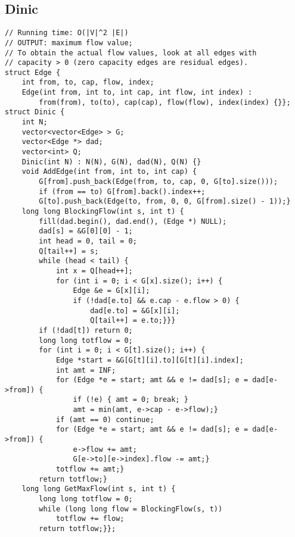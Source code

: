 \documentclass[8pt, oneside]{extarticle}
\begin{document}
\begin{multicols}{3}
\subsection{Dinic}
\begin{lstlisting}
// Running time: O(|V|^2 |E|)
// OUTPUT: maximum flow value;
// To obtain the actual flow values, look at all edges with
// capacity > 0 (zero capacity edges are residual edges).
struct Edge {
    int from, to, cap, flow, index;
    Edge(int from, int to, int cap, int flow, int index) :
        from(from), to(to), cap(cap), flow(flow), index(index) {}};
struct Dinic {
    int N;
    vector<vector<Edge> > G;
    vector<Edge *> dad;
    vector<int> Q;
    Dinic(int N) : N(N), G(N), dad(N), Q(N) {}
    void AddEdge(int from, int to, int cap) {
        G[from].push_back(Edge(from, to, cap, 0, G[to].size()));
        if (from == to) G[from].back().index++;
        G[to].push_back(Edge(to, from, 0, 0, G[from].size() - 1));}
    long long BlockingFlow(int s, int t) {
        fill(dad.begin(), dad.end(), (Edge *) NULL);
        dad[s] = &G[0][0] - 1;
        int head = 0, tail = 0;
        Q[tail++] = s;
        while (head < tail) {
            int x = Q[head++];
            for (int i = 0; i < G[x].size(); i++) {
                Edge &e = G[x][i];
                if (!dad[e.to] && e.cap - e.flow > 0) {
                    dad[e.to] = &G[x][i];
                    Q[tail++] = e.to;}}}
        if (!dad[t]) return 0;
        long long totflow = 0;
        for (int i = 0; i < G[t].size(); i++) {
            Edge *start = &G[G[t][i].to][G[t][i].index];
            int amt = INF;
            for (Edge *e = start; amt && e != dad[s]; e = dad[e->from]) {
                if (!e) { amt = 0; break; }
                amt = min(amt, e->cap - e->flow);}
            if (amt == 0) continue;
            for (Edge *e = start; amt && e != dad[s]; e = dad[e->from]) {
                e->flow += amt;
                G[e->to][e->index].flow -= amt;}
            totflow += amt;}
        return totflow;}
    long long GetMaxFlow(int s, int t) {
        long long totflow = 0;
        while (long long flow = BlockingFlow(s, t))
            totflow += flow;
        return totflow;}};
\end{lstlisting}

\end{multicols}
\end{document}
